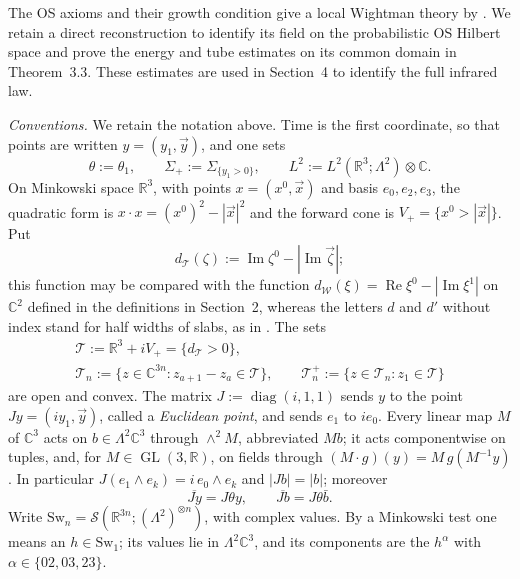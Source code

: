 \documentclass[11pt,letterpaper,reqno]{amsart}
\theoremstyle{definition}
\begin{document}
The OS axioms and their growth condition give a local Wightman theory
by \cite[Section~IV.1]{OS1975}. We retain a direct reconstruction to
identify its field on the probabilistic OS Hilbert space and prove
the energy and tube estimates on its common domain in Theorem~3.3. These
estimates are used in Section~4 to identify the full infrared law.

\emph{Conventions.}
We retain the notation above.
Time is the first coordinate, so that points are written $y=(y_1,\vec y)$, and one sets
\begin{equation*}
\theta:=\theta_1,\qquad \Sigma_+:=\Sigma_{\{y_1>0\}},\qquad L^2:=L^2(\mathbb R^3;\Lambda^2)\otimes\mathbb C.
\end{equation*}
On Minkowski space $\mathbb R^3$, with points $x=(x^0,\vec x)$ and basis $e_0,e_2,e_3$, the quadratic form is $x\cdot x=(x^0)^2-|\vec x|^2$ and the forward cone is $V_+=\{x^0>|\vec x|\}$.
Put
\begin{equation*}
d_{\mathcal T}(\zeta):=\operatorname{Im}\zeta^0-|\operatorname{Im}\vec\zeta|;
\end{equation*}
this function may be compared with the function $d_{\mathcal W}(\xi)=\allowbreak \operatorname{Re}\xi^0-|\operatorname{Im}\xi^1|$ on $\mathbb C^2$ defined in the definitions in Section~2, whereas the letters $d$ and $d'$ without index stand for half widths of slabs, as in \cite[Proposition~8.1]{QEDConstruction}.
The sets
\begin{gather*}
\mathcal T:=\mathbb R^3+iV_+=\{d_{\mathcal T}>0\},\\
\mathcal T_n:=\{z\in\mathbb C^{3n}:z_{a+1}-z_a\in\mathcal T\},\qquad \mathcal T_n^+:=\{z\in\mathcal T_n:z_1\in\mathcal T\}
\end{gather*}
are open and convex.
The matrix $J:=\operatorname{diag}(i,1,1)$ sends $y$ to the point $Jy=(iy_1,\vec y)$, called a \emph{Euclidean point}, and sends $e_1$ to $ie_0$.
Every linear map $M$ of $\mathbb C^3$ acts on $b\in\Lambda^2\mathbb C^3$ through $\wedge^2M$, abbreviated $Mb$; it acts componentwise on tuples, and, for $M\in\operatorname{GL}(3,\mathbb R)$, on fields through $(M\cdot g)(y)=M\,g(M^{-1}y)$.
In particular $J(e_1\wedge e_k)=i\,e_0\wedge e_k$ and $|Jb|=|b|$; moreover
\begin{equation}
\overline{Jy}=J\theta y,\qquad \overline{Jb}=J\theta\bar b.
\tag{K}
\end{equation}
Write $\mathrm{Sw}_n=\mathcal S(\mathbb R^{3n};(\Lambda^2)^{\otimes n})$, with complex values.
By a Minkowski test one means an $h\in\mathrm{Sw}_1$; its values lie in $\Lambda^2\mathbb C^3$, and its components are the $h^\alpha$ with $\alpha\in\{02,03,23\}$.
\end{document}
